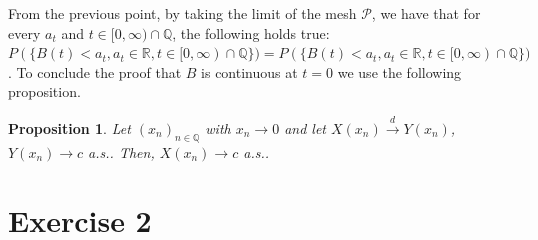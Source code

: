\documentclass[a4paper,12pt]{article} %
\newtheorem{proposition}{Proposition}
\begin{document}
From the previous point, by taking the limit of the mesh \(\mathcal{P}\), we have that for every \(a_t\) and \(t \in  [0, \infty ) \cap \mathbb{Q}\), the following holds true: \(P(\{ B(t) <a_t , a_t \in  \mathbb{R},t \in  [0, \infty ) \cap \mathbb{Q} \} ) = P(\{ B(t) <a_t , a_t \in  \mathbb{R},t \in  [0, \infty ) \cap \mathbb{Q} \} )\).
To conclude the proof that \(B\) is continuous at \(t=0\) we use the following proposition.
\begin{proposition}
    Let \((x_n)_{n \in  \mathbb{Q}}\) with \(x_n \to 0\) and let \( X(x_n) \xrightarrow{d} Y(x_n) \), \( Y(x_n) \to c \) a.s.. Then, \( X(x_n) \to c \) a.s..
\end{proposition}



\section{Exercise 2}
\end{document}
